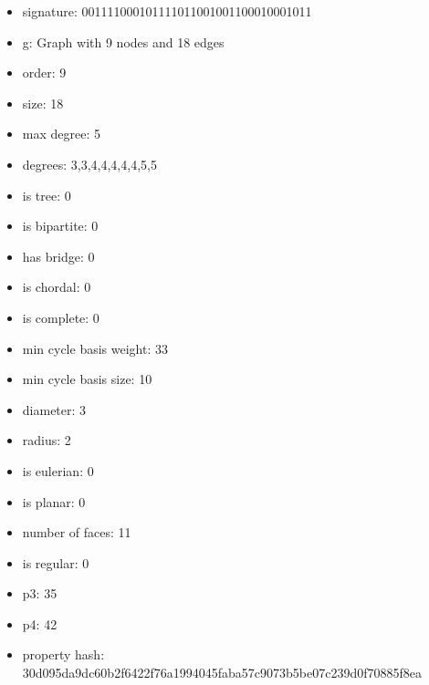 \newpage
\begin{figure}
\end{figure}
\begin{itemize}
\item signature: 001111000101111011001001100010001011
\item g: Graph with 9 nodes and 18 edges
\item order: 9
\item size: 18
\item max degree: 5
\item degrees: 3,3,4,4,4,4,4,5,5
\item is tree: 0
\item is bipartite: 0
\item has bridge: 0
\item is chordal: 0
\item is complete: 0
\item min cycle basis weight: 33
\item min cycle basis size: 10
\item diameter: 3
\item radius: 2
\item is eulerian: 0
\item is planar: 0
\item number of faces: 11
\item is regular: 0
\item p3: 35
\item p4: 42
\item property hash: 30d095da9dc60b2f6422f76a1994045faba57c9073b5be07c239d0f70885f8ea
\end{itemize}
